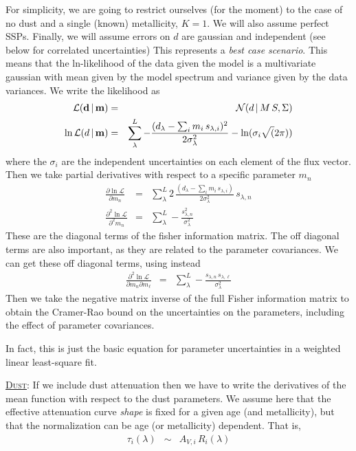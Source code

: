 \documentclass{article}
\begin{document}
For simplicity, we are going to restrict ourselves (for the moment) to the case of no dust and a single (known) metallicity, $K=1$.
We will also assume perfect SSPs.
Finally, we will assume errors on $d$ are gaussian and independent (see below for correlated uncertainties)
This represents a \emph{best case scenario}.
This means that the ln-likelihood of the data given the model is a multivariate
gaussian with mean given by the model spectrum and variance given by the data variances.
We write the likelihood as
\begin{eqnarray}
\mathcal{L}({\bf d} \,|\, {\bf m}) & = & \mathcal{N}(d \,|\, M \, S, \Sigma) \\
 \ln \mathcal{L}(d \,|\, {\bf m}) & = & \sum^L_\lambda -\frac{(d_\lambda - \sum_i m_i \, s_{\lambda, i})^2}
                                                      {2 \sigma_\lambda^2} - \ln(\sigma_i\sqrt(2\pi))
\end{eqnarray}
where the $\sigma_i$ are the independent uncertainties on each element of the flux vector.
Then we take partial derivatives with respect to a specific parameter $m_n$
\begin{eqnarray}
\frac{\partial \ln \mathcal{L}}{\partial m_n} & = & \sum^L_\lambda  2 \, \frac{(d_\lambda - \sum_i m_i \, s_{\lambda, i})}{2 \sigma_\lambda^2} \, s_{\lambda, n} \\
\frac{\partial^2 \ln \mathcal{L}}{\partial^2 m_n} & = & \sum^L_\lambda -\frac{s_{\lambda, n}^2}{\sigma_\lambda^2} 
\end{eqnarray}
These are the diagonal terms of the fisher information matrix.  The off diagonal terms are also important, as they are related to the parameter covariances. We can get these off diagonal terms, using instead
\begin{eqnarray}
\frac{\partial^2 \ln \mathcal{L}}{\partial m_n \partial m_\ell} & = & \sum^L_\lambda -\frac{s_{\lambda, n}\, s_{\lambda, \ell}}{\sigma_\lambda^2} 
\end{eqnarray}
Then we take the negative matrix inverse of the full Fisher information matrix to obtain the Cramer-Rao bound on the uncertainties on the parameters, including the effect of parameter covariances.

In fact, this is just the basic equation for parameter uncertainties in a weighted linear least-square fit.


\underline{\textsc{Dust}}:
If we include dust attenuation then we have to write the derivatives of the mean function with respect to the dust parameters.
We assume here that the effective attenuation curve \emph{shape} is fixed for a given age (and metallicity), but that the normalization can be age (or metallicity) dependent.
That is, 
\begin{eqnarray}
\tau_{i}(\lambda)  & \sim & A_{V, i} \, R_{i}(\lambda)\\
\end{eqnarray}
\end{document}
